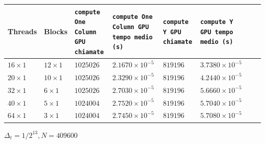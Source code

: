 \begin{table}[h!]
    \centering
    \begin{tabularx}{1\textwidth} { 
      | >{\centering\arraybackslash}X 
      | >{\centering\arraybackslash}X
      | >{\centering\arraybackslash}X
      | >{\centering\arraybackslash}X
      | >{\centering\arraybackslash}X
      | >{\centering\arraybackslash}X
      | >{\centering\arraybackslash}X
      | >{\centering\arraybackslash}X|
    }
    \hline  Threads & Blocks & \texttt{compute One Column GPU chiamate} & \texttt{compute One Column GPU tempo medio (s)} & \texttt{compute Y GPU chiamate} & \texttt{compute Y GPU tempo medio (s)} \\
    \hline $16 \times 1$ & $12 \times 1$ & $1025026$ & $2.1670 \times 10^{-5}$ & $819196$ & $3.7380 \times 10^{-5}$ \\
    \hline $20 \times 1$ & $10 \times 1$ & $1025026$ & $2.3290 \times 10^{-5}$ & $819196$ & $4.2440 \times 10^{-5}$ \\
    \hline $32 \times 1$ & $6 \times 1$ & $1025026$ & $2.7030 \times 10^{-5}$ & $819196$ & $5.6660 \times 10^{-5}$ \\
    \hline $40 \times 1$ & $5 \times 1$ & $1024004$ & $2.7520 \times 10^{-5}$ & $819196$ & $5.7040 \times 10^{-5}$ \\
    \hline $64 \times 1$ & $3 \times 1$ & $1024004$ & $2.7450 \times 10^{-5}$ & $819196$ & $5.7080 \times 10^{-5}$ \\
    \hline
    \end{tabularx}
    \label{tab:second_macro_module_time_N_204800}
\end{table}
\vspace{0.2cm}

\newpage
\noindent
\begin{center}
    $\Delta _t = 1 / 2^{13}, N = 409600$
\end{center}

